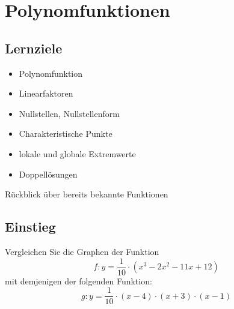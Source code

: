 
\section{Polynomfunktionen}

\subsection*{Lernziele}

\begin{itemize}
\item Polynomfunktion
\item Linearfaktoren
\item Nullstellen, Nullstellenform
\item Charakteristische Punkte
\item lokale und globale Extremwerte
\item Doppellösungen
\end{itemize}


Rückblick über bereits bekannte Funktionen


\subsection{Einstieg}
Vergleichen Sie die Graphen der Funktion
$$f: y= \frac1{10}\cdot{}(x^3-2x^2-11x+12)$$
mit demjenigen der folgenden Funktion:
$$g: y=\frac1{10}\cdot{}(x-4)\cdot{}(x+3)\cdot{}(x-1)$$



